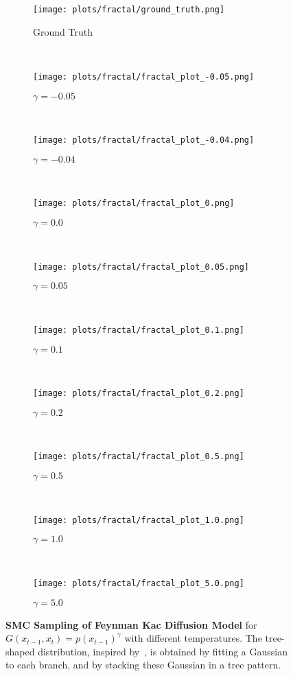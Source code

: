 \begin{figure*}[b]
    \centering
    \begin{subfigure}[t]{0.19\textwidth}
        \centering
        \texttt{[image: plots/fractal/ground\_truth.png]}
        \caption{Ground Truth}
    \end{subfigure}%
    ~ 
    \begin{subfigure}[t]{0.19\textwidth}
        \centering
        \texttt{[image: plots/fractal/fractal\_plot\_-0.05.png]}
        \caption{$\gamma=-0.05$}
    \end{subfigure}%
    ~ 
    \begin{subfigure}[t]{0.19\textwidth}
        \centering
        \texttt{[image: plots/fractal/fractal\_plot\_-0.04.png]}
        \caption{$\gamma=-0.04$}
    \end{subfigure}%
    ~ 
    \begin{subfigure}[t]{0.19\textwidth}
        \centering
        \texttt{[image: plots/fractal/fractal\_plot\_0.png]}
        \caption{$\gamma=0.0$}
    \end{subfigure}%
    ~ 
    \begin{subfigure}[t]{0.19\textwidth}
        \centering
        \texttt{[image: plots/fractal/fractal\_plot\_0.05.png]}
        \caption{$\gamma=0.05$}
    \end{subfigure}%
    \\
    \begin{subfigure}[t]{0.19\textwidth}
        \centering
        \texttt{[image: plots/fractal/fractal\_plot\_0.1.png]}
        \caption{$\gamma=0.1$}
    \end{subfigure}%
    ~ 
    \begin{subfigure}[t]{0.19\textwidth}
        \centering
        \texttt{[image: plots/fractal/fractal\_plot\_0.2.png]}
        \caption{$\gamma=0.2$}
    \end{subfigure}%
    ~ 
    \begin{subfigure}[t]{0.19\textwidth}
        \centering
        \texttt{[image: plots/fractal/fractal\_plot\_0.5.png]}
        \caption{$\gamma=0.5$}
    \end{subfigure}%
    ~ 
    \begin{subfigure}[t]{0.19\textwidth}
        \centering
        \texttt{[image: plots/fractal/fractal\_plot\_1.0.png]}
        \caption{$\gamma=1.0$}
    \end{subfigure}%
    ~ 
    \begin{subfigure}[t]{0.19\textwidth}
        \centering
        \texttt{[image: plots/fractal/fractal\_plot\_5.0.png]}
        \caption{$\gamma=5.0$}
    \end{subfigure}%
    \caption{\textbf{SMC Sampling of Feynman Kac Diffusion Model} for $G(x_{t-1},x_t)=p(x_{t-1})^\gamma$ with different temperatures. The tree-shaped distribution, inspired by~\citet{karras2024guiding}, is obtained by fitting a Gaussian to each branch, and by stacking these Gaussian in a tree pattern.}   
    \label{fig:temp_tree}
\end{figure*}